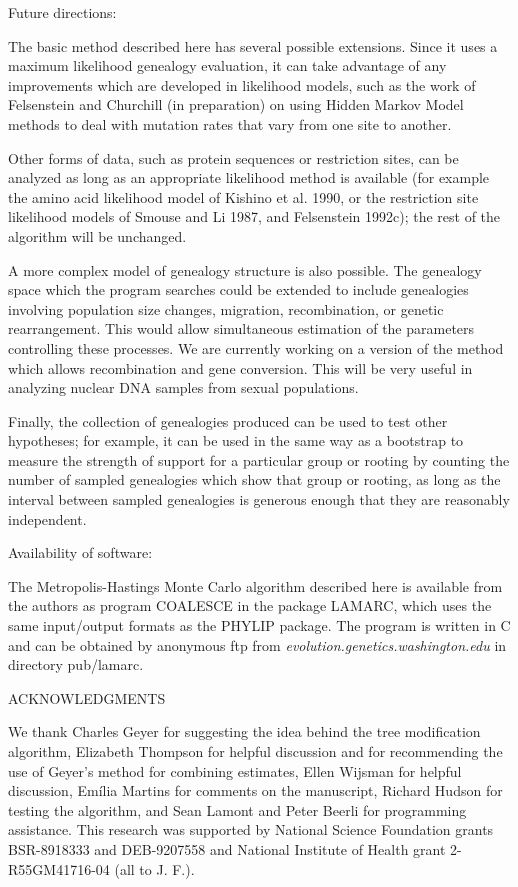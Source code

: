 \documentclass[12pt]{article}
\begin{document}
\begin{bf}
Future directions:
\end{bf}
The basic method described here has several possible extensions.  Since
it uses a maximum likelihood genealogy evaluation, it can take advantage of
any improvements which are developed in likelihood 
models, such as the work of
{\sc Felsenstein} and {\sc Churchill} (in preparation) on using Hidden Markov 
Model methods to deal with mutation rates that vary from one site to another.

Other forms of data, such as protein sequences or restriction sites,
can be analyzed as long as an appropriate likelihood method is available
(for example the amino acid likelihood model of {\sc Kishino} et al.
1990, or the restriction site likelihood models of {\sc Smouse}
and {\sc Li} 1987, and {\sc Felsenstein 1992c});
the rest of the algorithm will be unchanged.

A more complex model of genealogy structure is also possible.  
The genealogy space which the program searches could be extended to
include genealogies involving population size changes, migration,
recombination, or genetic rearrangement.  This would allow simultaneous estimation of the
parameters controlling these processes.  We are currently working on a
version of the method which allows recombination and gene conversion.
This will be very useful in analyzing nuclear DNA samples from
sexual populations.

Finally, the collection of genealogies produced can be used to test
other hypotheses; for example, it can be used in the same way as a
bootstrap to measure the strength of support for a particular
group or rooting by counting the number of sampled genealogies which show
that group or rooting, as long as the interval between sampled
genealogies is generous enough that they are reasonably independent.

\begin{bf}
Availability of software:
\end{bf}
The Metropolis-Hastings Monte Carlo algorithm described here is
available from the authors as program COALESCE in the package LAMARC, which 
uses the same 
input/output formats as the PHYLIP package.  The program is written in C
and can be obtained by anonymous ftp from
{\it evolution.genetics.washington.edu} in directory pub/lamarc.

\bigskip
\begin{center}
ACKNOWLEDGMENTS
\bigskip

\end{center}
We thank {\sc Charles Geyer} for suggesting the idea behind the tree
modification algorithm, {\sc Elizabeth Thompson} for helpful discussion
and for recommending the
use of {\sc Geyer}'s method for 
combining estimates,
{\sc Ellen Wijsman} for helpful discussion, {\sc
Em\'{i}lia Martins}
for comments on the manuscript, {\sc Richard Hudson}
for testing the algorithm, and {\sc Sean Lamont} and {\sc Peter Beerli}
for programming assistance.  This research was supported by National
Science Foundation grants BSR-8918333 and DEB-9207558 and National Institute of
Health grant 2-R55GM41716-04 (all to J. F.).
\newpage
\end{document}
